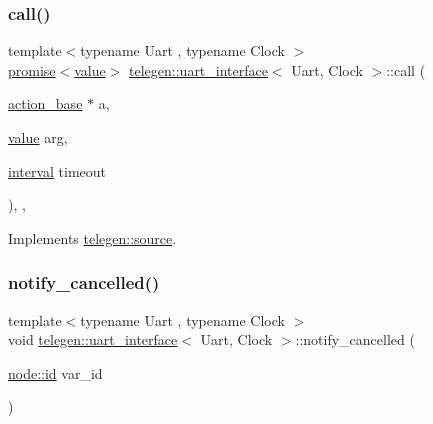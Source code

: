 \subsubsection{\texorpdfstring{call()}{call()}}
{\footnotesize\ttfamily template$<$typename Uart , typename Clock $>$ \\
\hyperlink{namespacetelegen_a9dd802bb5d30cf96b0c616750d43ae86}{promise}$<$\hyperlink{classtelegen_1_1value}{value}$>$ \hyperlink{classtelegen_1_1uart__interface}{telegen\+::uart\+\_\+interface}$<$ Uart, Clock $>$\+::call (\begin{DoxyParamCaption}\item[{\hyperlink{classtelegen_1_1action__base}{action\+\_\+base} $\ast$}]{a,  }\item[{\hyperlink{classtelegen_1_1value}{value}}]{arg,  }\item[{\hyperlink{namespacetelegen_ad925de2d0a99bc43918533abf0457344}{interval}}]{timeout }\end{DoxyParamCaption})\hspace{0.3cm}{\ttfamily [inline]}, {\ttfamily [override]}, {\ttfamily [virtual]}}



Implements \hyperlink{classtelegen_1_1source_ae14191b0e6aa10521bb3d8fa5e1747e9}{telegen\+::source}.

\mbox{\label{classtelegen_1_1uart__interface_a62a2abc8dd84e273c18e4d6f123253dc}} 
\subsubsection{\texorpdfstring{notify\+\_\+cancelled()}{notify\_cancelled()}}
{\footnotesize\ttfamily template$<$typename Uart , typename Clock $>$ \\
void \hyperlink{classtelegen_1_1uart__interface}{telegen\+::uart\+\_\+interface}$<$ Uart, Clock $>$\+::notify\+\_\+cancelled (\begin{DoxyParamCaption}\item[{\hyperlink{classtelegen_1_1node_aae3ff0d12932c55fdc88a1743e27ea56}{node\+::id}}]{var\+\_\+id }\end{DoxyParamCaption})\hspace{0.3cm}{\ttfamily [inline]}}

